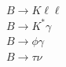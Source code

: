 \documentclass[preprint,3p,12pt]{elsarticle}
\begin{document}

\textbf{$B\to K\ell \ell$}\\

\textbf{$B \to K^{*} \gamma$}\\

\textbf{$B\to \phi \gamma$}\\
%    

\textbf{$B\to \tau \nu$}\\
\end{document}
